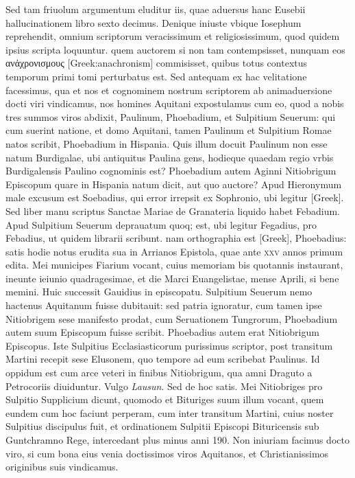 \begin{parnumbers}
{}
Sed tam friuolum argumentum eluditur iis, quae aduersus
hanc Eusebii hallucinationem libro sexto decimus.
\lnr{}Denique iniuste
vbique Iosephum reprehendit, omnium scriptorum veracissimum
et religiosissimum, quod quidem ipsius scripta loquuntur.
\lnr{}quem
auctorem si non tam contempsisset, nunquam eos
 \textgreek{ανἀχρονισμους [Greek:anachronism]} commisisset,
quibus totus contextus temporum primi tomi perturbatus
est.
\lnr{}Sed antequam ex hac velitatione facessimus, qua et nos et cognominem
nostrum scriptorem ab animaduersione docti viri vindicamus,
nos homines Aquitani expostulamus cum eo, quod a nobis
tres summos viros abdixit, Paulinum, Phoebadium, et Sulpitium
Seuerum:
\lnr{}qui cum suerint natione, et domo Aquitani, tamen
Paulinum et Sulpitium Romae natos scribit, Phoebadium in Hispania.
\lnr{}Quis illum docuit Paulinum non esse natum Burdigalae, ubi
antiquitus Paulina gens, hodieque quaedam regio vrbis Burdigalensis
Paulino cognominis est?
\lnr{}Phoebadium autem Aginni Nitiobrigum
Episcopum quare in Hispania natum dicit, aut quo auctore?
\lnr{}Apud Hieronymum male excusum est Soebadius, qui error irrepsit
ex Sophronio, ubi legitur \textgreek{[Greek]}.
\lnr{}Sed liber manu scriptus
Sanctae Mariae de Granateria liquido habet Febadium.
\lnr{}Apud Sulpitium
Seuerum deprauatum quoq; est, ubi legitur Fegadius, pro
Febadius, ut quidem librarii scribunt.
\lnr{}nam orthographia est \textgreek{[Greek]},
Phoebadius: satis hodie notus erudita sua in Arrianos Epistola,
quae ante \textsc{xxv} annos primum edita.
\lnr{}Mei municipes Fiarium vocant,
cuius memoriam bis quotannis instaurant, ineunte ieiunio
quadragesimae, et die Marci Euangelistae, mense Aprili, si bene
memini.
\lnr{}Huic successit Gauidius in episcopatu.
\lnr{}Sulpitium Seuerum
nemo hactenus Aquitanum fuisse dubitauit: sed patria ignoratur,
cum tamen ipse Nitiobrigem sese manifesto prodat, cum Seruationem
Tungrorum, Phoebadium autem suum Episcopum fuisse scribit.
\lnr{}Phoebadius autem erat Nitiobrigum Episcopus.
\lnr{}Iste Sulpitius
Ecclasiasticorum purissimus scriptor, post transitum Martini recepit
sese Elusonem, quo tempore ad eum scribebat Paulinus.
\lnr{}Id oppidum est cum arce veteri in finibus Nitiobrigum, qua amni Draguto
a Petrocoriis diuiduntur.
\lnr{}Vulgo \textit{Lausun}.
\lnr{}Sed de hoc satis.
\lnr{}Mei
Nitiobriges pro Sulpitio Supplicium dicunt, quomodo et Bituriges
suum illum vocant, quem eundem cum hoc faciunt perperam,
cum inter transitum Martini, cuius noster Sulpitius discipulus fuit,
et ordinationem Sulpitii Episcopi Bituricensis sub Guntchramno
Rege, intercedant plus minus anni 190.
\lnr{}Non iniuriam facimus
docto viro, si cum bona eius venia doctissimos viros Aquitanos,
et Christianissimos originibus suis vindicamus.


\end{parnumbers}
